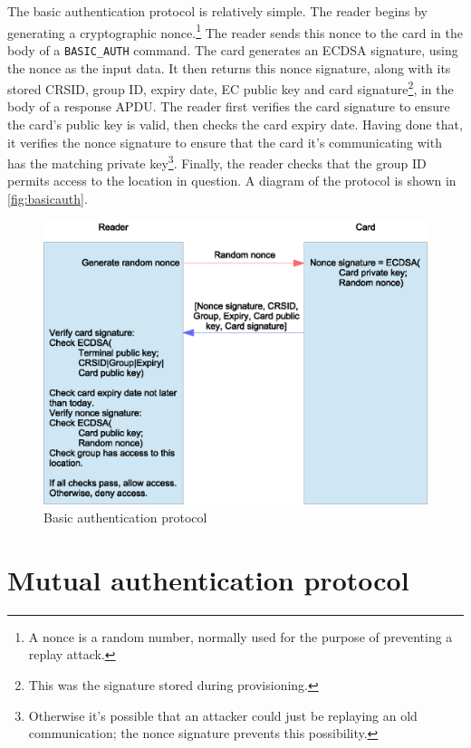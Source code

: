 \documentclass[12pt,a4paper,twoside,openright]{report}
\begin{document}
The basic authentication protocol is relatively simple. The reader begins by generating a cryptographic nonce.\footnote{A nonce is a random number, normally used for the purpose of preventing a replay attack.} The reader sends this nonce to the card in the body of a \texttt{BASIC\_AUTH} command. The card generates an ECDSA signature, using the nonce as the input data. It then returns this nonce signature, along with its stored CRSID, group ID, expiry date, EC public key and card signature\footnote{This was the signature stored during provisioning.}, in the body of a response APDU. The reader first verifies the card signature to ensure the card's public key is valid, then checks the card expiry date. Having done that, it verifies the nonce signature to ensure that the card it's communicating with has the matching private key\footnote{Otherwise it's possible that an attacker could just be replaying an old communication; the nonce signature prevents this possibility.}. Finally, the reader checks that the group ID permits access to the location in question. A diagram of the protocol is shown in \autoref{fig:basicauth}.

\begin{figure}[tbh]
\centerline{\includegraphics[scale=0.8]{figures/basicauth.eps}}
\caption{Basic authentication protocol}
\label{fig:basicauth}
\end{figure}

\section{Mutual authentication protocol}
\label{mutualauth}
\end{document}
